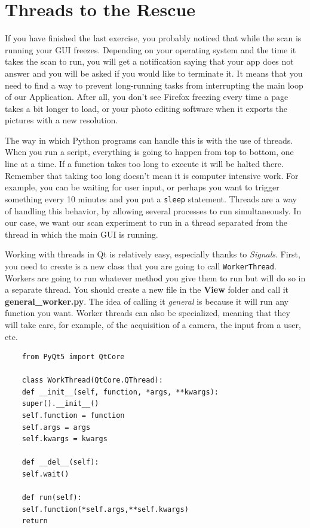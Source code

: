 \section{Threads to the Rescue}\label{threads-to-therescue}
If you have finished the last exercise, you probably noticed that while
the scan is running your {GUI} freezes. Depending on your operating
system and the time it takes the scan to run, you will get a
notification saying that your app does not answer and you will be asked
if you would like to terminate it. It means that you need to find a way
to prevent long-running tasks from interrupting the main loop of our
Application. After all, you don't see Firefox freezing every time a page
takes a bit longer to load, or your photo editing software when it
exports the pictures with a new resolution.

The way in which Python programs can handle this is with the use of
threads. When you run a script, everything is going to happen from top
to bottom, one line at a time. If a function takes too long to execute
it will be halted there. Remember that taking too long doesn't mean it
is computer intensive work. For example, you can be waiting for user
input, or perhaps you want to trigger something every 10 minutes and you
put a \texttt{sleep} statement. Threads are a way of handling this
behavior, by allowing several processes to run simultaneously. In our
case, we want our scan experiment to run in a thread separated from the
thread in which the main {GUI} is running.


Working with threads in Qt is relatively easy, especially thanks to
\emph{Signals}. First, you need to create is a new class that you are
going to call \texttt{WorkerThread}. Workers are going to run whatever
method you give them to run but will do so in a separate thread. You
should create a new file in the \textbf{View} folder and call it
\textbf{general\_worker.py}. The idea of calling it \emph{general} is
because it will run any function you want. Worker threads can also be
specialized, meaning that they will take care, for example, of the
acquisition of a camera, the input from a user, etc.

\begin{verbatim}
    from PyQt5 import QtCore

    class WorkThread(QtCore.QThread):
    def __init__(self, function, *args, **kwargs):
    super().__init__()
    self.function = function
    self.args = args
    self.kwargs = kwargs

    def __del__(self):
    self.wait()

    def run(self):
    self.function(*self.args,**self.kwargs)
    return
\end{verbatim}

